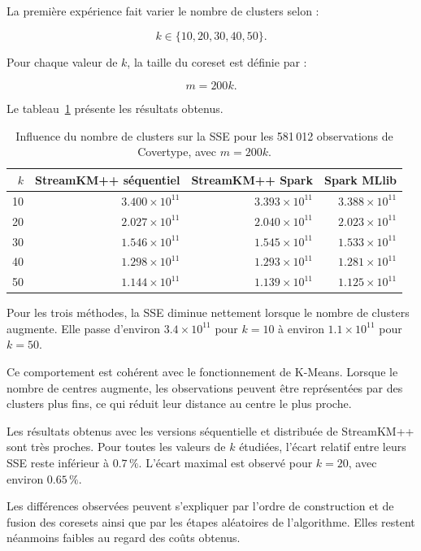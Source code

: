 La première expérience fait varier le nombre de clusters selon :

\[
k \in \{10,20,30,40,50\}.
\]

Pour chaque valeur de \(k\), la taille du coreset est définie par :

\[
m = 200k.
\]

Le tableau~\ref{tab:quality-k} présente les résultats obtenus.

\begin{table}[ht]
\centering
\small
\begin{tabular}{rrrr}
\toprule
\textbf{\(k\)} &
\textbf{StreamKM++ séquentiel} &
\textbf{StreamKM++ Spark} &
\textbf{Spark MLlib} \\
\midrule
10 & \(3.400 \times 10^{11}\) & \(3.393 \times 10^{11}\) & \(3.388 \times 10^{11}\) \\
20 & \(2.027 \times 10^{11}\) & \(2.040 \times 10^{11}\) & \(2.023 \times 10^{11}\) \\
30 & \(1.546 \times 10^{11}\) & \(1.545 \times 10^{11}\) & \(1.533 \times 10^{11}\) \\
40 & \(1.298 \times 10^{11}\) & \(1.293 \times 10^{11}\) & \(1.281 \times 10^{11}\) \\
50 & \(1.144 \times 10^{11}\) & \(1.139 \times 10^{11}\) & \(1.125 \times 10^{11}\) \\
\bottomrule
\end{tabular}
\caption{Influence du nombre de clusters sur la SSE pour les 581\,012 observations de Covertype, avec \(m=200k\).}
\label{tab:quality-k}
\end{table}

Pour les trois méthodes, la SSE diminue nettement lorsque le nombre de clusters augmente. Elle passe d'environ \(3.4 \times 10^{11}\) pour \(k=10\) à environ \(1.1 \times 10^{11}\) pour \(k=50\).

Ce comportement est cohérent avec le fonctionnement de K-Means. Lorsque le nombre de centres augmente, les observations peuvent être représentées par des clusters plus fins, ce qui réduit leur distance au centre le plus proche.

Les résultats obtenus avec les versions séquentielle et distribuée de StreamKM++ sont très proches. Pour toutes les valeurs de \(k\) étudiées, l'écart relatif entre leurs SSE reste inférieur à \(0.7\,\%\). L'écart maximal est observé pour \(k=20\), avec environ \(0.65\,\%\).

Les différences observées peuvent s'expliquer par l'ordre de construction et de fusion des coresets ainsi que par les étapes aléatoires de l'algorithme. Elles restent néanmoins faibles au regard des coûts obtenus.

